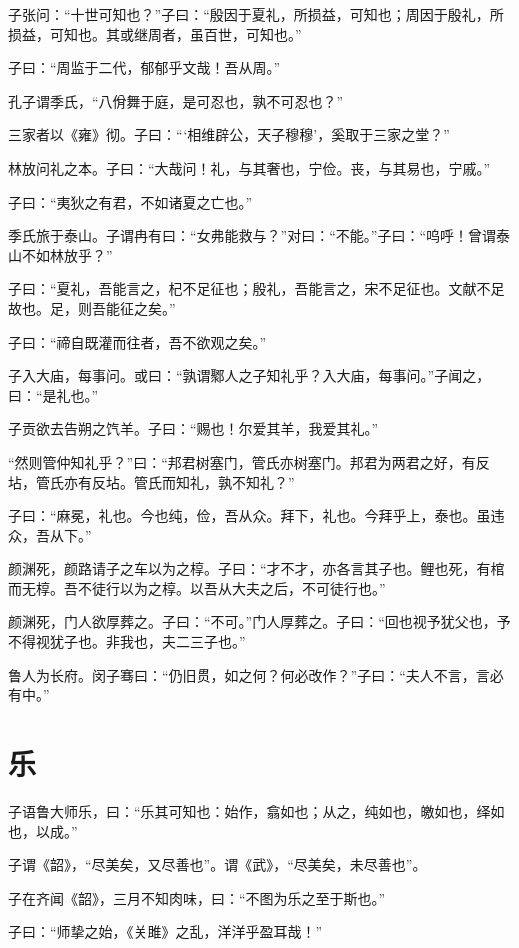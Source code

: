 \documentclass[a5paper]{ctexbook}
\begin{document}
    子张问：“十世可知也？”子曰：“殷因于夏礼，所损益，可知也；周因于殷礼，所损益，可知也。其或继周者，虽百世，可知也。”

    子曰：“周监于二代，郁郁乎文哉！吾从周。”

    孔子谓季氏，“八佾舞于庭，是可忍也，孰不可忍也？”

    三家者以《雍》彻。子曰：“‘相维辟公，天子穆穆’，奚取于三家之堂？”

    林放问礼之本。子曰：“大哉问！礼，与其奢也，宁俭。丧，与其易也，宁戚。”

    子曰：“夷狄之有君，不如诸夏之亡也。”

    季氏旅于泰山。子谓冉有曰：“女弗能救与？”对曰：“不能。”子曰：“呜呼！曾谓泰山不如林放乎？”

    子曰：“夏礼，吾能言之，杞不足征也；殷礼，吾能言之，宋不足征也。文献不足故也。足，则吾能征之矣。”

    子曰：“禘自既灌而往者，吾不欲观之矣。”

    子入大庙，每事问。或曰：“孰谓鄹人之子知礼乎？入大庙，每事问。”子闻之，曰：“是礼也。”

    子贡欲去告朔之饩羊。子曰：“赐也！尔爱其羊，我爱其礼。”

    “然则管仲知礼乎？”曰：“邦君树塞门，管氏亦树塞门。邦君为两君之好，有反坫，管氏亦有反坫。管氏而知礼，孰不知礼？”

    子曰：“麻冕，礼也。今也纯，俭，吾从众。拜下，礼也。今拜乎上，泰也。虽违众，吾从下。”

    颜渊死，颜路请子之车以为之椁。子曰：“才不才，亦各言其子也。鲤也死，有棺而无椁。吾不徒行以为之椁。以吾从大夫之后，不可徒行也。”

    颜渊死，门人欲厚葬之。子曰：“不可。”门人厚葬之。子曰：“回也视予犹父也，予不得视犹子也。非我也，夫二三子也。”

    鲁人为长府。闵子骞曰：“仍旧贯，如之何？何必改作？”子曰：“夫人不言，言必有中。”

    \chapter{乐}

    子语鲁大师乐，曰：“乐其可知也：始作，翕如也；从之，纯如也，皦如也，绎如也，以成。”

    子谓《韶》，“尽美矣，又尽善也”。谓《武》，“尽美矣，未尽善也”。

    子在齐闻《韶》，三月不知肉味，曰：“不图为乐之至于斯也。”

    子曰：“师挚之始，《关雎》之乱，洋洋乎盈耳哉！”
\end{document}

